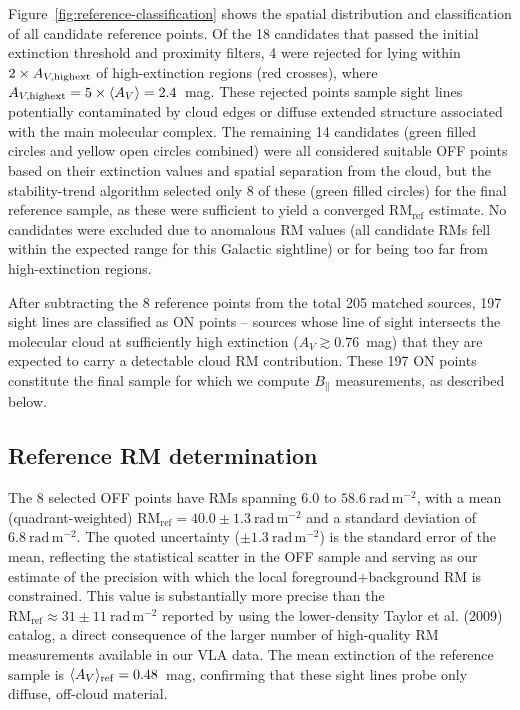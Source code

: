 \documentclass[twocolumn]{aastex631}
\begin{document}
Figure~\ref{fig:reference-classification} shows the spatial distribution and classification of all candidate reference points. Of the 18 candidates that passed the initial extinction threshold and proximity filters, 4 were rejected for lying within $2 \times A_{V,\rm highext}$ of high-extinction regions (red crosses), where $A_{V,\rm highext} = 5 \times \langle A_V \rangle = 2.4$~mag. These rejected points sample sight lines potentially contaminated by cloud edges or diffuse extended structure associated with the main molecular complex. The remaining 14 candidates (green filled circles and yellow open circles combined) were all considered suitable OFF points based on their extinction values and spatial separation from the cloud, but the stability-trend algorithm selected only 8 of these (green filled circles) for the final reference sample, as these were sufficient to yield a converged $\mathrm{RM_{ref}}$ estimate. No candidates were excluded due to anomalous RM values (all candidate RMs fell within the expected range for this Galactic sightline) or for being too far from high-extinction regions.

After subtracting the 8 reference points from the total 205 matched sources, 197 sight lines are classified as ON points -- sources whose line of sight intersects the molecular cloud at sufficiently high extinction ($A_V \gtrsim 0.76$~mag) that they are expected to carry a detectable cloud RM contribution. These 197 ON points constitute the final sample for which we compute $B_\parallel$ measurements, as described below.

\subsection{Reference RM determination}

The 8 selected OFF points have RMs spanning $6.0$ to $58.6~\mathrm{rad\,m^{-2}}$, with a mean (quadrant-weighted) $\mathrm{RM_{ref}} = 40.0 \pm 1.3~\mathrm{rad\,m^{-2}}$ and a standard deviation of $6.8~\mathrm{rad\,m^{-2}}$. The quoted uncertainty ($\pm 1.3~\mathrm{rad\,m^{-2}}$) is the standard error of the mean, reflecting the statistical scatter in the OFF sample and serving as our estimate of the precision with which the local foreground+background RM is constrained. This value is substantially more precise than the $\mathrm{RM_{ref}} \approx 31 \pm 11~\mathrm{rad\,m^{-2}}$ reported by \citet{tahani2018} using the lower-density Taylor et al. (2009) catalog, a direct consequence of the larger number of high-quality RM measurements available in our VLA data. The mean extinction of the reference sample is $\langle A_V \rangle_{\rm ref} = 0.48$~mag, confirming that these sight lines probe only diffuse, off-cloud material.
\end{document}
